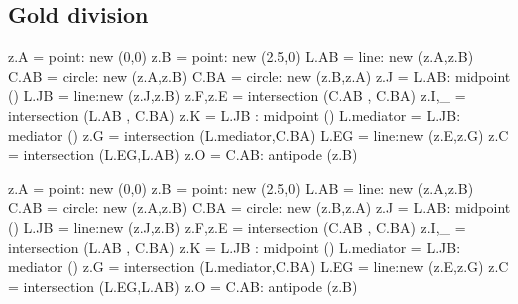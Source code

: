 \subsection{Gold division} %
\label{sub:gold_division}

\begin{tkzexample}[latex=0cm,small,code only]
\begin{tkzelements}
z.A         = point:  new (0,0)
z.B         = point:  new (2.5,0)
L.AB        = line:   new (z.A,z.B)
C.AB        = circle: new (z.A,z.B)
C.BA        = circle: new (z.B,z.A)
z.J         = L.AB: midpoint ()
L.JB        = line:new (z.J,z.B)
z.F,z.E     = intersection (C.AB , C.BA)
z.I,_       = intersection (L.AB , C.BA)
z.K         = L.JB : midpoint ()
L.mediator  = L.JB: mediator ()
z.G         = intersection (L.mediator,C.BA)
L.EG        = line:new (z.E,z.G)
z.C         = intersection  (L.EG,L.AB)
z.O         = C.AB: antipode (z.B)
\end{tkzelements}
\end{tkzexample}

\begin{tkzelements}
z.A     = point:  new (0,0)
z.B     = point:  new (2.5,0)
L.AB    = line:   new (z.A,z.B)
C.AB    = circle: new (z.A,z.B)
C.BA    = circle: new (z.B,z.A)
z.J     = L.AB: midpoint ()
L.JB    = line:new (z.J,z.B)
z.F,z.E = intersection (C.AB , C.BA)
z.I,_   = intersection (L.AB , C.BA)
z.K     = L.JB : midpoint ()
L.mediator  = L.JB: mediator ()
z.G   = intersection (L.mediator,C.BA)
L.EG    = line:new (z.E,z.G)
z.C     = intersection  (L.EG,L.AB)
z.O     = C.AB: antipode (z.B)
\end{tkzelements}

\hspace*{\fill}
  \hspace*{\fill}

